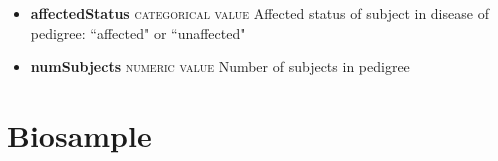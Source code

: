 \documentclass[a4paper, 10pt]{article}        %
\begin{document}
\begin{description}
\begin{itemize}
			\item[] \textbf{affectedStatus} {\textsc{categorical value}} Affected status of subject in disease of pedigree: ``affected" or ``unaffected"
			\item[] \textbf{numSubjects} {\textsc{numeric value}} Number of subjects in pedigree
	\end{itemize}


 \end{description}

  
  \section*{ {\color{teal} Biosample}}
  
\end{document}
